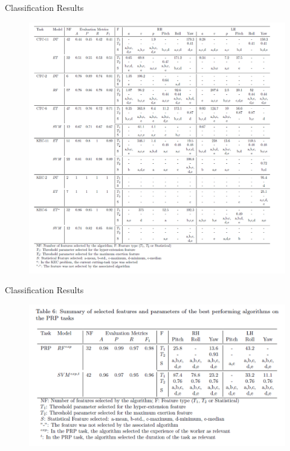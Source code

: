 \begin{frame}{Classification Results}
    \begin{figure}
        \includegraphics[scale=0.5]{img/results/classification_results_1.png}
    \end{figure}
\end{frame}

\begin{frame}{Classification Results}
    \begin{figure}
        \includegraphics[scale=0.6]{img/results/classification_results_2.png}
    \end{figure}
\end{frame}

